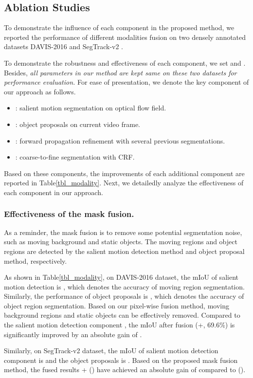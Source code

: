 \documentclass[journal]{IEEEtran}
\makeatletter
\newcommand{\tab}{{Table}\@\xspace}
\makeatother
\begin{document}
\subsection{Ablation Studies}
\label{sec:exp-influence}
To demonstrate the influence of each component in the proposed method,
we reported the performance of different modalities fusion on two densely annotated datasets DAVIS-2016 \cite{CVPR2016_Perazzi} and SegTrack-v2 \cite{ICCV2013_Li}. 

To demonstrate the robustness and effectiveness of each component, we set  and . Besides, \emph{all parameters in our method are kept same on these two datasets for performance evaluation.} 
For ease of presentation, we denote the key component of our approach as follows.
\begin{itemize}
	\item : salient motion segmentation on optical flow field.
	\item : object proposals on current video frame.
	\item : forward propagation refinement with several previous segmentations.
	\item : coarse-to-fine segmentation with CRF.
\end{itemize}
Based on these components,
the improvements of each additional component are reported in \tab \ref{tbl_modality}.
Next, we detailedly analyze the effectiveness of each component in our approach.

\subsubsection{Effectiveness of the mask fusion.}
As a reminder, the mask fusion is to remove some potential segmentation noise, such as moving background and static objects. The moving regions and object regions are detected by the salient motion detection method and object proposal method, respectively.  

As shown in \tab \ref{tbl_modality},
on DAVIS-2016 dataset, 
the mIoU of salient motion detection  is , which denotes the accuracy of moving region segmentation.
Similarly, the performance of object proposals  is , which denotes the accuracy of object region segmentation.
Based on our pixel-wise fusion method,
moving background regions and static objects can be effectively removed.
Compared to the salient motion detection component , 
the mIoU after fusion (+, 69.6\%) is significantly improved by an absolute gain of .

Similarly, on SegTrack-v2 dataset,
the mIoU of salient motion detection component  is  and the object proposals  is .
Based on the proposed mask fusion method, the fused results + () have achieved an absolute gain of  compared to  ().
\end{document}
